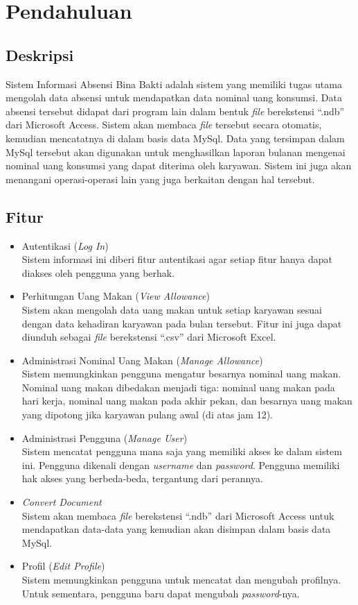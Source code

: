 \section{Pendahuluan}

\subsection{Deskripsi}
Sistem Informasi Absensi Bina Bakti adalah sistem yang memiliki tugas utama mengolah data absensi untuk mendapatkan data nominal uang konsumsi. Data absensi tersebut didapat dari program lain dalam bentuk \textit{file} berekstensi ``.ndb'' dari Microsoft Access. Sistem akan membaca \textit{file} tersebut secara otomatis, kemudian mencatatnya di dalam basis data MySql. Data yang tersimpan dalam MySql tersebut akan digunakan untuk menghasilkan laporan bulanan mengenai nominal uang konsumsi yang dapat diterima oleh karyawan. Sistem ini juga akan menangani operasi-operasi lain yang juga berkaitan dengan hal tersebut.

\subsection{Fitur}
\begin{itemize}
	\item Autentikasi	(\textit{Log In})
	\\Sistem informasi ini diberi fitur autentikasi agar setiap fitur hanya dapat diakses oleh pengguna yang berhak.
	\item Perhitungan Uang Makan (\textit{View Allowance})
	\\Sistem akan mengolah data uang makan untuk setiap karyawan sesuai dengan data kehadiran karyawan pada bulan tersebut. Fitur ini juga dapat diunduh sebagai \textit{file} berekstensi ``.csv'' dari Microsoft Excel.
	\item Administrasi Nominal Uang Makan (\textit{Manage Allowance})
	\\Sistem memungkinkan pengguna mengatur besarnya nominal uang makan. Nominal uang makan dibedakan menjadi tiga: nominal uang makan pada hari kerja, nominal uang makan pada akhir pekan, dan besarnya uang makan yang dipotong jika karyawan pulang awal (di atas jam 12).
	\item Administrasi Pengguna (\textit{Manage User})
	\\Sistem mencatat pengguna mana saja yang memiliki akses ke dalam sistem ini. Pengguna dikenali dengan \textit{username} dan \textit{password}. Pengguna memiliki hak akses yang berbeda-beda, tergantung dari perannya.
	\item \textit{Convert Document}
	\\Sistem akan membaca \textit{file} berekstensi ``.ndb'' dari Microsoft Access untuk mendapatkan data-data yang kemudian akan disimpan dalam basis data MySql.
	\item Profil (\textit{Edit Profile})
	\\Sistem memungkinkan pengguna untuk mencatat dan mengubah profilnya. Untuk sementara, pengguna baru dapat mengubah \textit{password}-nya.
\end{itemize}